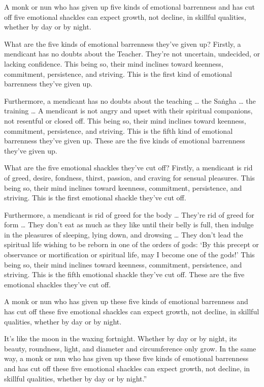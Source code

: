 \documentclass[12pt,openany]{book}%
\begin{document}
A monk or nun who has given up five kinds of emotional barrenness and has cut off five emotional shackles can expect growth, not decline, in skillful qualities, whether by day or by night. 

What are the five kinds of emotional barrenness they’ve given up? Firstly, a mendicant has no doubts about the Teacher. They’re not uncertain, undecided, or lacking confidence. This being so, their mind inclines toward keenness, commitment, persistence, and striving. This is the first kind of emotional barrenness they’ve given up. 

Furthermore, a mendicant has no doubts about the teaching … the \textsanskrit{Saṅgha} … the training … A mendicant is not angry and upset with their spiritual companions, not resentful or closed off. This being so, their mind inclines toward keenness, commitment, persistence, and striving. This is the fifth kind of emotional barrenness they’ve given up. These are the five kinds of emotional barrenness they’ve given up. 

What are the five emotional shackles they’ve cut off? Firstly, a mendicant is rid of greed, desire, fondness, thirst, passion, and craving for sensual pleasures. This being so, their mind inclines toward keenness, commitment, persistence, and striving. This is the first emotional shackle they’ve cut off. 

Furthermore, a mendicant is rid of greed for the body … They’re rid of greed for form … They don’t eat as much as they like until their belly is full, then indulge in the pleasures of sleeping, lying down, and drowsing … They don’t lead the spiritual life wishing to be reborn in one of the orders of gods: ‘By this precept or observance or mortification or spiritual life, may I become one of the gods!’ This being so, their mind inclines toward keenness, commitment, persistence, and striving. This is the fifth emotional shackle they’ve cut off. These are the five emotional shackles they’ve cut off. 

A monk or nun who has given up these five kinds of emotional barrenness and has cut off these five emotional shackles can expect growth, not decline, in skillful qualities, whether by day or by night. 

It’s like the moon in the waxing fortnight. Whether by day or by night, its beauty, roundness, light, and diameter and circumference only grow. In the same way, a monk or nun who has given up these five kinds of emotional barrenness and has cut off these five emotional shackles can expect growth, not decline, in skillful qualities, whether by day or by night.” 
\end{document}

